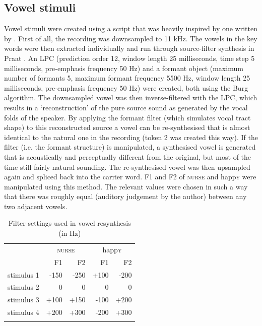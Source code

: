 \subsection{Vowel stimuli}\label{sec.perc_method.vow}

Vowel stimuli were created using a script that was heavily inspired by one written by \textcite{styler2008}.
First of all, the recording was downsampled to 11 kHz.
The vowels in the key words were then extracted individually and run through source-filter synthesis in Praat \parencite{praat}.
An LPC (prediction order 12, window length 25 milliseconds, time step 5 milliseconds, pre-emphasis frequency 50 Hz) and a formant object (maximum number of formants 5, maximum formant frequency 5500 Hz, window length 25 milliseconds, pre-emphasis frequency 50 Hz) were created, both using the Burg algorithm.
The downsampled vowel was then inverse-filtered with the LPC, which results in a `reconstruction' of the pure source sound as generated by the vocal folds of the speaker.
By applying the formant filter (which simulates vocal tract shape) to this reconstructed source a vowel can be re-synthesised that is almost identical to the natural one in the recording (token 2 was created this way).
If the filter (i.e. the formant structure) is manipulated, a synthesised vowel is generated that is acoustically and perceptually different from the original, but most of the time still fairly natural sounding.
The re-synthesised vowel was then upsampled again and spliced back into the carrier word.
F1 and F2 of \textsc{nurse} and happ\textsc{y} were manipulated using this method.
The relevant values were chosen in such a way that there was roughly equal  (auditory judgement by the author) between any two adjacent vowels.

\begin{table}
	\caption{Filter settings used in vowel resynthesis (in Hz)}
	\label{tab.vowel.stimuli}
	
	\begin{tabular}{lrrrr}
		\lsptoprule
		& \multicolumn{2}{c}{\textsc{nurse}} & \multicolumn{2}{c}{happ\textsc{y}}\\
		& F1 & F2 & F1 & F2\\
		\midrule
		stimulus 1 & -150 & -250 & +100 & -200\\
		stimulus 2 & 0 & 0 & 0 & 0\\
		stimulus 3 & +100 & +150 & -100 & +200\\
		stimulus 4 & +200 & +300 & -200 & +300\\
		\lspbottomrule
	\end{tabular}
\end{table}

